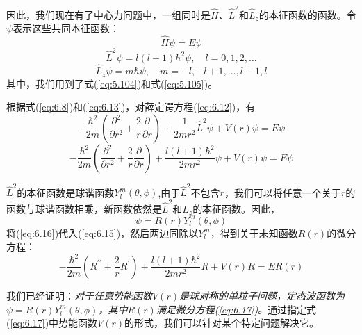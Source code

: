    因此，我们现在有了中心力问题中，一组同时是$\hat{H}$、$\hat{L}^2$和$\hat{L}_z$的本征函数的函数。令$\psi$表示这些共同本征函数：
    \begin{equation}
        \boxed{
            \hat{H}\psi = E\psi
        }
        \label{eq:6.12}
    \end{equation}
    \begin{equation}
        \boxed{
            \hat{L}^2\psi = l\left(l+1\right)\hbar^2\psi, \quad l = 0, 1, 2, \ldots
        }
        \label{eq:6.13}
    \end{equation}
    \begin{equation}
        \boxed{
            \hat{L}_z\psi = m\hbar\psi, \quad m = -l, -l+1, \ldots, l-1, l
        }
        \label{eq:6.14}
    \end{equation}
    其中，我们用到了式(\ref{eq:5.104})和式(\ref{eq:5.105})。

    根据式(\ref{eq:6.8})和(\ref{eq:6.13})，对薛定谔方程(\ref{eq:6.12})，有
    \begin{equation*}
        -\frac{\hbar^2}{2m}\left(\frac{\partial^2}{\partial r^2} + \frac{2}{r}\frac{\partial}{\partial r}\right) + \frac{1}{2mr^2}\hat{L}^2\psi + V\left(r\right)\psi = E\psi
    \end{equation*}
    \begin{equation}
        -\frac{\hbar^2}{2m}\left(\frac{\partial^2}{\partial r^2} + \frac{2}{r}\frac{\partial}{\partial r}\right) + \frac{l\left(l+1\right)\hbar^2}{2mr^2}\psi + V\left(r\right)\psi = E\psi
        \label{eq:6.15}
    \end{equation}

    $\hat{L}^2$的本征函数是球谐函数$Y_l^m\left(\theta, \phi\right)$,由于$\hat{L}^2$不包含$r$，我们可以将任意一个关于$r$的函数与球谐函数相乘，新函数依然是$\hat{L}^2$和$\hat{L}_z$的本征函数。因此，
    \begin{equation}
        \boxed{
            \psi = R\left(r\right)Y_l^m\left(\theta, \phi\right)
        }
        \label{eq:6.16}
    \end{equation}
    将(\ref{eq:6.16})代入(\ref{eq:6.15})，然后两边同除以$Y_l^m$，得到关于未知函数$R\left(r\right)$的微分方程：
    \begin{equation}
        -\frac{\hbar^2}{2m}\left(R^{\prime\prime}+ \frac{2}{r}R^{\prime}\right) + \frac{l\left(l+1\right)\hbar^2}{2mr^2}R + V\left(r\right)R = ER\left(r\right)
        \label{eq:6.17}
    \end{equation}

    我们已经证明：\textit{对于任意势能函数$V\left(r\right)$是球对称的单粒子问题，定态波函数为$\psi = R\left(r\right)Y_l^m\left(\theta, \phi\right)$，其中$R\left(r\right)$满足微分方程(\ref{eq:6.17})。}通过指定式(\ref{eq:6.17})中势能函数$V\left(r\right)$的形式，我们可以针对某个特定问题解决它。

